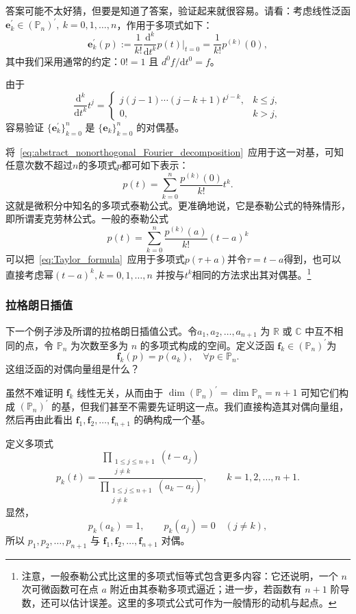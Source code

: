 答案可能不太好猜，但要是知道了答案，验证起来就很容易。请看：考虑线性泛函 $\mathbf{e}^{\prime}_k \in \left( \mathbb{P}_n \right)^{\prime},\  k = 0, 1, \ldots, n$，作用于多项式如下：
\[
    \mathbf{e}_k^\prime(p)
    :=\frac{1}{k!}\frac{\mathrm{d}^k}{\mathrm{d}t^k}p(t)\bigg|_{t=0}
    =\frac{1}{k!}p^{(k)}(0),
\]
其中我们采用通常的约定：$0!=1$ 且 $d^0f/\mathrm{d}t^0=f$。

由于
\[
    \frac{\mathrm{d}^k}{\mathrm{d}t^k}t^j
    =
    \begin{cases}
        j(j-1)\cdots(j-k+1)t^{j-k},&k\le j,\\
        0,&k>j,
    \end{cases}
\]
容易验证 $\{\mathbf{e}_k^\prime\}_{k=0}^n$ 是
$\{\mathbf{e}_k\}_{k=0}^n$ 的对偶基。

将~\eqref{eq:abstract_nonorthogonal_Fourier_decomposition}~应用于这一对基，可知任意次数不超过$n$的多项式$p$都可如下表示：
\begin{equation}\label{eq:Taylor_formula}
    p(t)=\sum_{k=0}^{n}\frac{p^{(k)}(0)}{k!}t^k.
\end{equation}
这就是微积分中知名的多项式泰勒公式。更准确地说，它是泰勒公式的特殊情形，即所谓麦克劳林公式。一般的泰勒公式
\[
    p(t)=\sum_{k=0}^{n}\frac{p^{(k)}(a)}{k!}(t-a)^k
\]
可以把~\eqref{eq:Taylor_formula}~应用于多项式$p(\tau+a)$并令$\tau=t-a$得到，也可以直接考虑幂$(t-a)^k,k=0,1,\dots,n$
并按与$t^k$相同的方法求出其对偶基。\footnote{注意，一般泰勒公式比这里的多项式恒等式包含更多内容：它还说明，一个 $n$ 次可微函数可在点 $a$ 附近由其泰勒多项式逼近；进一步，若函数有 $n+1$ 阶导数，还可以估计误差。这里的多项式公式可作为一般情形的动机与起点。}

\subsubsection{拉格朗日插值}

下一个例子涉及所谓的拉格朗日插值公式。令$a_1,a_2,\ldots,a_{n+1}$
为 $\mathbb{R}$ 或 $\mathbb{C}$ 中互不相同的点，令 $\mathbb{P}_n$ 为次数至多为 $n$ 的多项式构成的空间。定义泛函
$\mathbf{f}_k\in(\mathbb{P}_n)^\prime$为
\[
    \mathbf{f}_k(p)=p(a_k),\quad \forall p\in\mathbb{P}_n.
\]
这组泛函的对偶向量组是什么？

虽然不难证明 $\mathbf{f}_k$ 线性无关，从而由于
$\dim(\mathbb{P}_n)^\prime=\dim\mathbb{P}_n=n+1$
可知它们构成 $(\mathbb{P}_n)^\prime$ 的基，但我们甚至不需要先证明这一点。我们直接构造其对偶向量组，然后再由此看出
$\mathbf{f}_1,\mathbf{f}_2,\ldots,\mathbf{f}_{n+1}$ 的确构成一个基。

定义多项式
\[
    p_k(t)
    =
    \frac{\displaystyle\prod_{\substack{1\le j\le n+1\\j\ne k}}(t-a_j)}
         {\displaystyle\prod_{\substack{1\le j\le n+1\\j\ne k}}(a_k-a_j)},
    \qquad k=1,2,\ldots,n+1.
\]
显然，
\[
    p_k(a_k)=1,\qquad
    p_k(a_j)=0\quad(j\ne k),
\]
所以 $p_1,p_2,\ldots,p_{n+1}$ 与 $\mathbf{f}_1,\mathbf{f}_2,\ldots,\mathbf{f}_{n+1}$ 对偶。

